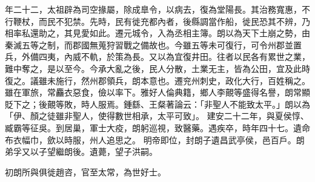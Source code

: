 \begin{pinyinscope}
 
年二十二，太祖辟為司空掾屬，除成臯令，以病去，復為堂陽長。其治務寬惠，不行鞭杖，而民不犯禁。先時，民有徙充都內者，後縣調當作船，徙民恐其不辨，乃相率私還助之，其見愛如此。遷元城令，入為丞相主簿。朗以為天下土崩之勢，由秦滅五等之制，而郡國無蒐狩習戰之備故也。今雖五等未可復行，可令州郡並置兵，外備四夷，內威不軌，於策為長。又以為宜復井田。往者以民各有累世之業，難中奪之，是以至今。今承大亂之後，民人分散，土業无主，皆為公田，宜及此時復之。議雖未施行，然州郡領兵，朗本意也。遷兖州刺史，政化大行，百姓稱之。雖在軍旅，常麤衣惡食，儉以率下。雅好人倫典籍，鄉人李覿等盛得名譽，朗常顯貶下之；後覿等敗，時人服焉。鍾繇、王粲著論云：「非聖人不能致太平。」朗以為「伊、顏之徒雖非聖人，使得數世相承，太平可致」。
 建安二十二年，與夏侯惇、臧霸等征吳。到居巢，軍士大疫，朗躬巡視，致醫藥。遇疾卒，時年四十七。遺命布衣幅巾，歛以時服，州人追思之。
 明帝即位，封朗子遺昌武亭侯，邑百戶。朗弟孚又以子望繼朗後。遺薨，望子洪嗣。
 
 
初朗所與俱徙趙咨，官至太常，為世好士。
 
 
\end{pinyinscope}
